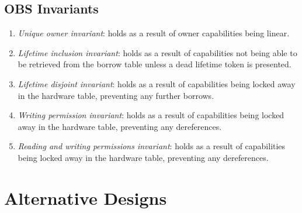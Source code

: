 \subsection{OBS Invariants}
\begin{enumerate}
    \item \textit{Unique owner invariant}: holds as a result of owner capabilities being linear.
    \item \textit{Lifetime inclusion invariant}: holds as a result of capabilities not being able to be retrieved from the borrow table unless a dead lifetime token is presented.
    \item \textit{Lifetime disjoint invariant}: holds as a result of capabilities being locked away in the hardware table, preventing any further borrows.
    \item \textit{Writing permission invariant}: holds as a result of capabilities being locked away in the hardware table, preventing any dereferences.
    \item \textit{Reading and writing permissions invariant}: holds as a result of capabilities being locked away in the hardware table, preventing any dereferences.
\end{enumerate}

\section{Alternative Designs}
